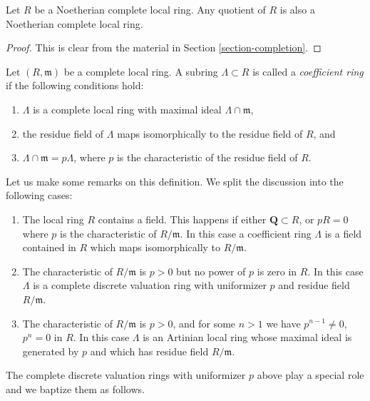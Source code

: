 \begin{lemma}
\label{lemma-quotient-complete-local}
Let $R$ be a Noetherian complete local ring.
Any quotient of $R$ is also a Noetherian complete local ring.
\end{lemma}

\begin{proof}
This is clear from the material in Section \ref{section-completion}.
\end{proof}

\begin{definition}
\label{definition-coefficient-ring}
Let $(R, \mathfrak m)$ be a complete local ring.
A subring $\Lambda \subset R$ is
called a {\it coefficient ring} if the following conditions hold:
\begin{enumerate}
\item $\Lambda$ is a complete local ring with maximal ideal
$\Lambda \cap \mathfrak m$,
\item the residue field of $\Lambda$ maps isomorphically to the
residue field of $R$, and
\item $\Lambda \cap \mathfrak m = p\Lambda$, where $p$ is the characteristic
of the residue field of $R$.
\end{enumerate}
\end{definition}

\noindent
Let us make some remarks on this definition. We split the discussion
into the following cases:
\begin{enumerate}
\item The local ring $R$ contains a field. This happens if
either $\mathbf{Q} \subset R$, or $pR = 0$ where $p$ is the
characteristic of $R/\mathfrak m$. In this case a coefficient ring
$\Lambda$ is a field contained in $R$ which maps isomorphically to
$R/\mathfrak m$.
\item The characteristic of $R/\mathfrak m$ is $p > 0$ but no
power of $p$ is zero in $R$. In this case $\Lambda$ is a complete
discrete valuation ring with uniformizer $p$ and residue field $R/\mathfrak m$.
\item The characteristic of $R/\mathfrak m$ is $p > 0$, and for some
$n > 1$ we have $p^{n - 1} \not = 0$, $p^n = 0$ in $R$. In this case
$\Lambda$ is an Artinian local ring whose maximal ideal is
generated by $p$ and which has residue field $R/\mathfrak m$.
\end{enumerate}
The complete discrete valuation rings with uniformizer $p$
above play a special role and we baptize them as follows.

